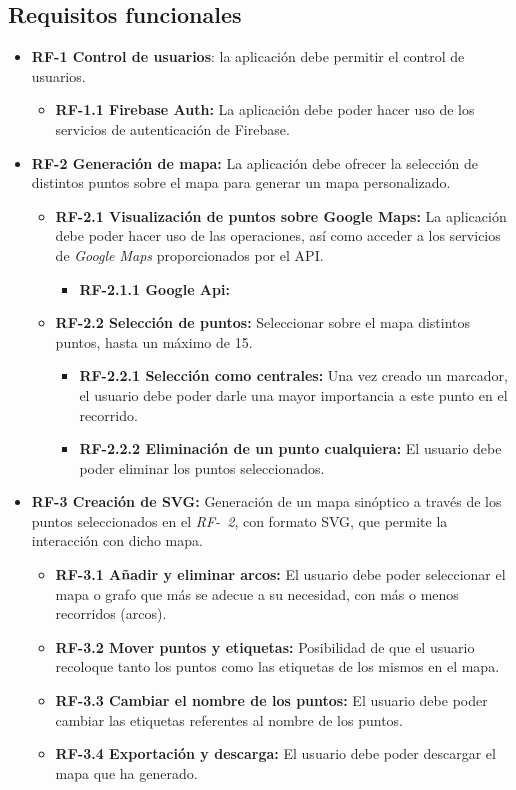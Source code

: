\subsection{Requisitos funcionales}
\begin{itemize}
	\item \textbf{RF-1 Control de usuarios}: la aplicación debe permitir el control de usuarios.
	\begin{itemize}
		\item \textbf{RF-1.1 Firebase Auth:} La aplicación debe poder hacer uso de los servicios de autenticación de Firebase.
	\end{itemize}
	\item \textbf{RF-2 Generación de mapa:} La aplicación debe ofrecer la selección de distintos puntos sobre el mapa para generar un mapa personalizado.
	\begin{itemize}
		\item \textbf{RF-2.1 Visualización de puntos sobre Google Maps:} La aplicación debe poder hacer uso de las operaciones, así como acceder a los servicios de \textit{Google Maps} proporcionados por el API.
		\begin{itemize}
			\item \textbf{RF-2.1.1 Google Api:}
		\end{itemize}
		\item \textbf{RF-2.2 Selección de puntos:} Seleccionar sobre el mapa distintos puntos, hasta un máximo de 15.
		\begin{itemize}
			\item \textbf{RF-2.2.1 Selección como centrales:} Una vez creado un marcador, el usuario debe poder darle una mayor importancia a este punto en el recorrido.
			\item \textbf{RF-2.2.2 Eliminación de un punto cualquiera:} El usuario debe poder eliminar los puntos seleccionados. 
		\end{itemize}
		
	\end{itemize}
	\item \textbf{RF-3 Creación de SVG:} Generación de un mapa sinóptico a través de los puntos seleccionados en el \textit{RF-~2}, con formato SVG, que permite la interacción con dicho mapa.
	\begin{itemize}
		\item \textbf{RF-3.1 Añadir y eliminar arcos:} El usuario debe poder seleccionar el mapa o grafo que más se adecue a su necesidad, con más o menos recorridos (arcos).
		\item \textbf{RF-3.2 Mover puntos y etiquetas:} Posibilidad de que el usuario recoloque tanto los puntos como las etiquetas de los mismos en el mapa.
		\item \textbf{RF-3.3 Cambiar el nombre de los puntos:} El usuario debe poder cambiar las etiquetas referentes al nombre de los puntos.
		\item \textbf{RF-3.4 Exportación y descarga:} El usuario debe poder descargar el mapa que ha generado.
	\end{itemize}
\end{itemize}


